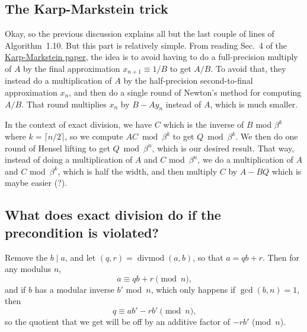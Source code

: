 \documentclass{computer-arithmetic}
\begin{document}
\subsection{The Karp-Markstein trick}

Okay, so the previous discussion explains all but the last couple of
lines of Algorithm~1.10. But this part is relatively simple. From
reading Sec.~4 of the
\href{https://dl.acm.org/doi/pdf/10.1145/279232.279237}{Karp-Markstein
  paper}, the idea is to avoid having to do a full-precision multiply
of \(A\) by the final approximation \(x_{n+1} ≡ 1/B\) to get
\(A/B\). To avoid that, they instead do a multiplication of \(A\) by
the half-precision second-to-final approximation \(x_n\), and then do
a single round of Newton's method for computing \(A/B\). That round
multiplies \(x_n\) by \(B - Ay_n\) instead of \(A\), which is much
smaller.

In the context of exact division, we have \(C\) which is the inverse
of \(B\) mod \(β^k\) where \(k = ⌈n/2⌉\), so we compute
\(AC \bmod β^k\) to get \(Q \bmod β^k\). We then do one round of
Hensel lifting to get \(Q \bmod β^n\), which is our desired
result. That way, instead of doing a multiplication of \(A\) and \(C\)
mod~\(β^n\), we do a multiplication of \(A\) and \(C\) mod~\(β^k\),
which is half the width, and then multiply \(C\) by \(A - BQ\) which
is maybe easier (?).

\subsection{What does exact division do if the precondition is violated?}

Remove the \(b \mid a\), and let
\((q, r) = \operatorname{divmod}(a, b)\), so that \(a = qb + r\). Then
for any modulus \(n\),
\[
  a ≡ qb + r \pmod n\text{,}
\]
and if \(b\) has a modular inverse \(b'\) mod~\(n\), which only
happens if \(\gcd(b, n) = 1\), then
\[
  q ≡ ab' - rb' \pmod n\text{,}
\]
so the quotient that we get will be off by an additive factor of
\(-rb'\) (mod~\(n\)).
\end{document}
